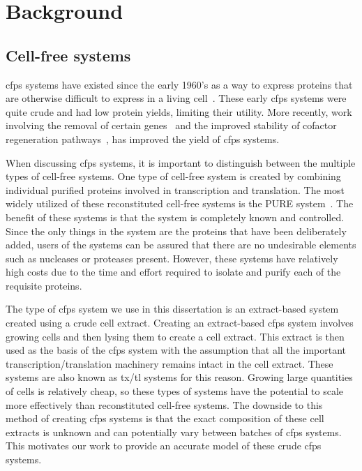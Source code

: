 \chapter{Background}\label{chap:bkg}


\section{Cell-free systems}
\gls{cfps} systems have existed since the early 1960's as a way to express proteins that are otherwise difficult to express in a living cell~\cite{nirenberg1961dependence}.
These early \gls{cfps} systems were quite crude and had low protein yields, limiting their utility.
More recently, work involving the removal of certain genes~\cite{calhoun2006total} and the improved stability of cofactor regeneration pathways~\cite{jewett2008integrated}, has improved the yield of \gls{cfps} systems.

When discussing \gls{cfps} systems, it is important to distinguish between the multiple types of cell-free systems.
One type of cell-free system is created by combining individual purified proteins involved in transcription and translation.
The most widely utilized of these reconstituted cell-free systems is the PURE system~\cite{shimizu2001cell}.
The benefit of these systems is that the system is completely known and controlled.
Since the only things in the system are the proteins that have been deliberately added, users of the systems can be assured that there are no undesirable elements such as nucleases or proteases present.
However, these systems have relatively high costs due to the time and effort required to isolate and purify each of the requisite proteins.

The type of \gls{cfps} system we use in this dissertation is an extract-based system created using a crude cell extract.
Creating an extract-based \gls{cfps} system involves growing cells and then lysing them to create a cell extract.
This extract is then used as the basis of the \gls{cfps} system with the assumption that all the important transcription/translation machinery remains intact in the cell extract.
These systems are also known as \gls{tx}/\gls{tl} systems for this reason.
Growing large quantities of cells is relatively cheap, so these types of systems have the potential to scale more effectively than reconstituted cell-free systems. 
The downside to this method of creating \gls{cfps} systems is that the exact composition of these cell extracts is unknown and can potentially vary between batches of \gls{cfps} systems.
This motivates our work to provide an accurate model of these crude \gls{cfps} systems.

